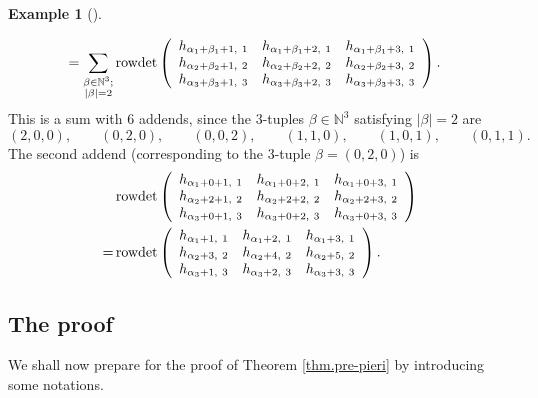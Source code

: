 \documentclass
[numbers=enddot,12pt,final,onecolumn,notitlepage,english]{scrartcl}%
\theoremstyle{definition}
\newtheorem{exam}[theo]{Example}
\newenvironment{example}[1][]
{\begin{exam}[#1]\begin{leftbar}}
{\end{leftbar}\end{exam}}
\let\sumnonlimits\sum
\renewcommand{\sum}{\sumnonlimits\limits}
\newenvironment{verlong}{}{}
\begin{document}
\begin{verlong}
\begin{example}
\begin{align*}
&  =\sum_{\substack{\beta\in\mathbb{N}^{3};\\\left\vert \beta\right\vert
=2}}\operatorname*{rowdet}\left(
\begin{array}
[c]{ccc}%
h_{\alpha_{1}+\beta_{1}+1,\ 1} & h_{\alpha_{1}+\beta_{1}+2,\ 1} &
h_{\alpha_{1}+\beta_{1}+3,\ 1}\\
h_{\alpha_{2}+\beta_{2}+1,\ 2} & h_{\alpha_{2}+\beta_{2}+2,\ 2} &
h_{\alpha_{2}+\beta_{2}+3,\ 2}\\
h_{\alpha_{3}+\beta_{3}+1,\ 3} & h_{\alpha_{3}+\beta_{3}+2,\ 3} &
h_{\alpha_{3}+\beta_{3}+3,\ 3}%
\end{array}
\right)  .
\end{align*}
This is a sum with $6$ addends, since the $3$-tuples $\beta\in\mathbb{N}^{3}$
satisfying $\left\vert \beta\right\vert =2$ are
\[
\left(  2,0,0\right)  ,\qquad\left(  0,2,0\right)  ,\qquad\left(
0,0,2\right)  ,\qquad\left(  1,1,0\right)  ,\qquad\left(  1,0,1\right)
,\qquad\left(  0,1,1\right)  .
\]
The second addend (corresponding to the $3$-tuple $\beta=\left(  0,2,0\right)
$) is%
\begin{align*}
&  \operatorname*{rowdet}\left(
\begin{array}
[c]{ccc}%
h_{\alpha_{1}+0+1,\ 1} & h_{\alpha_{1}+0+2,\ 1} & h_{\alpha_{1}+0+3,\ 1}\\
h_{\alpha_{2}+2+1,\ 2} & h_{\alpha_{2}+2+2,\ 2} & h_{\alpha_{2}+2+3,\ 2}\\
h_{\alpha_{3}+0+1,\ 3} & h_{\alpha_{3}+0+2,\ 3} & h_{\alpha_{3}+0+3,\ 3}%
\end{array}
\right) \\
=  &  \operatorname*{rowdet}\left(
\begin{array}
[c]{ccc}%
h_{\alpha_{1}+1,\ 1} & h_{\alpha_{1}+2,\ 1} & h_{\alpha_{1}+3,\ 1}\\
h_{\alpha_{2}+3,\ 2} & h_{\alpha_{2}+4,\ 2} & h_{\alpha_{2}+5,\ 2}\\
h_{\alpha_{3}+1,\ 3} & h_{\alpha_{3}+2,\ 3} & h_{\alpha_{3}+3,\ 3}%
\end{array}
\right)  .
\end{align*}

\end{example}
\end{verlong}

\subsection{The proof}

We shall now prepare for the proof of Theorem \ref{thm.pre-pieri} by
introducing some notations.
\end{document}
